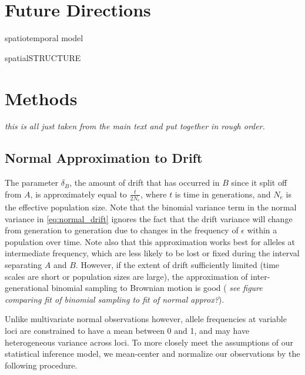 \documentclass[12pt]{article}
\newcommand{\gb}[1]{{\em \color{magenta} #1}}
\begin{document}
\section*{Future Directions}

spatiotemporal model

spatialSTRUCTURE

\section*{Methods}
\gb{this is all just taken from the main text and put together in rough order.}
\
\subsection*{Normal Approximation to Drift}
The parameter $\delta_B$, the amount of drift that has occurred in $B$ since it split off from $A$, is approximately equal to $\frac{t}{2N_e}$, where $t$ is time in generations, and $N_e$ is the effective population size.  Note that the binomial variance term in the normal variance in \eqref{eq:normal_drift} ignores the fact that the drift variance will change from generation to generation due to changes in the frequency of $\epsilon$ within a population over time.  Note also that this approximation works best for alleles at intermediate frequency, which are less likely to be lost or fixed during the interval separating $A$ and $B$.  However, if the extent of drift sufficiently limited (time scales are short or population sizes are large), the approximation of inter-generational binomial sampling to Brownian motion is good (\gb{see figure comparing fit of binomial sampling to fit of normal approx?}).  

Unlike multivariate normal observations however, allele frequencies at variable loci are constrained to have a mean between 0 and 1, and may have heterogeneous variance across loci.  To more closely meet the assumptions of our statistical inference model, we mean-center and normalize our observations by the following procedure.
\end{document}
